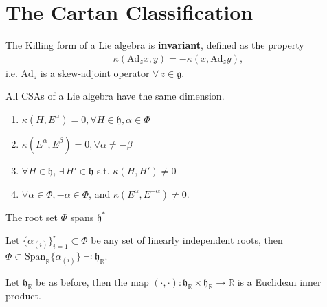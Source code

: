 \documentclass[11pt,fleqn,final]{article}
\begin{document}
\section{The Cartan Classification}

\begin{prop}
The Killing form of a Lie algebra is \textbf{invariant}, defined as the property
\begin{align}
\kappa ( \text{Ad}_z x,y) = - \kappa( x, \text{Ad}_z y),
\end{align}
i.e. $\text{Ad}_z$ is a skew-adjoint operator $\forall \, z \in \mathfrak{g}$.
\end{prop}

\begin{prop}
All CSAs of a Lie algebra have the same dimension.
\end{prop}

\begin{prop}
\begin{enumerate}[label=(\roman*)]
\item \label{CWBFact1} $\kappa(H,E^\alpha) = 0, \forall H \in \mathfrak{h}, \alpha \in \Phi$
\item \label{CWBFact2} $\kappa(E^\alpha, E^\beta) = 0, \forall \alpha \neq -\beta$
\item \label{CWBFact3} $\forall H \in \mathfrak{h}, \, \exists \, H' \in \mathfrak{h}$ s.t. $\kappa(H,H') \neq 0$
\item \label{CWBFact4} $\forall \alpha \in \Phi, -\alpha \in \Phi$, and $\kappa(E^\alpha, E^{-\alpha}) \neq 0$.
\end{enumerate}
\end{prop}

\begin{prop}
The root set $\Phi$ spans $\mathfrak{h}^*$
\end{prop}

\begin{prop}
Let $\{ \alpha_{(i)} \}_{i=1}^r \subset \Phi$ be any set of linearly independent roots, then $\Phi \subset \text{Span}_\mathbb{R} \{ \alpha_{(i)} \} \eqqcolon \mathfrak{h}_\mathbb{R}$.
\end{prop}

\begin{prop}\label{prop:realRootGeometry}
Let $\mathfrak{h}_\mathbb{R}$ be as before, then the map $(\cdot,\cdot): \mathfrak{h}_\mathbb{R} \times \mathfrak{h}_\mathbb{R} \to \mathbb{R}$ is a Euclidean inner product.
\end{prop}
\end{document}
